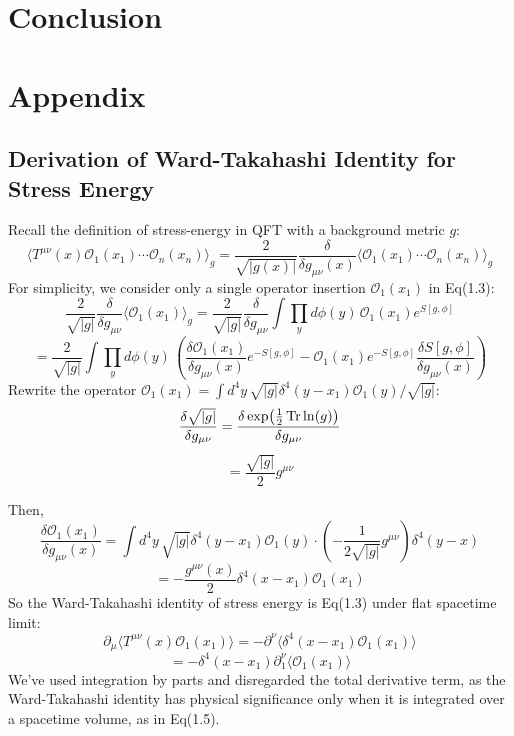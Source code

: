\documentclass[12pt]{article}
\numberwithin{equation}{section}
\newcommand\<\langle
\renewcommand\>\rangle
\renewcommand\.{\cdot}
\begin{document}
\section{Conclusion}

\section*{Appendix}
\subsection*{Derivation of Ward-Takahashi Identity for Stress Energy}
Recall the definition of stress-energy in QFT with a background metric $g$:
\begin{equation*}
    \langle T^{\mu\nu}(x)\mathcal{O}_1(x_1)\cdots\mathcal{O}_n(x_n)\rangle_g = \frac{2}{\sqrt{|g(x)|}}\frac{\delta}{\delta g_{\mu\nu}(x)}\langle\mathcal{O}_1(x_1)\cdots\mathcal{O}_n(x_n)\rangle_{g}
\end{equation*}
For simplicity, we consider only a single operator insertion $\mathcal{O}_1(x_1)$ in Eq(1.3):
\[
    \frac{2}{\sqrt{|g|}}\frac{\delta}{\delta g_{\mu\nu}}\langle\mathcal{O}_1(x_1)\rangle_g = \frac{2}{\sqrt{|g|}}\frac{\delta}{\delta g_{\mu\nu}}\int{\prod_{y}d\phi(y)\,}\mathcal{O}_1(x_1)e^{S[g,\phi]}
\]
\[
    = \frac{2}{\sqrt{|g|}}\int{\prod_{y}d\phi(y)\,}\left(\frac{\delta\mathcal{O}_1(x_1)}{\delta g_{\mu\nu}(x)}e^{-S[g,\phi]} - \mathcal{O}_1(x_1)e^{-S[g,\phi]}\frac{\delta S[g,\phi]}{\delta g_{\mu\nu}(x)}\right)
\]
Rewrite the operator $\mathcal{O}_1(x_1) = \int{d^4y\,} \sqrt{|g|}\delta^4(y-x_1)\mathcal{O}_1(y)/\sqrt{|g|}$:
\[
    \frac{\delta\sqrt{|g|}}{\delta g_{\mu\nu}} = \frac{\delta\exp(\frac{1}{2}\Tr\ln(g))}{\delta g_{\mu\nu}}
\]
\[
    =\frac{\sqrt{|g|}}{2}g^{\mu\nu}
\]

Then,
\[
    \frac{\delta\mathcal{O}_1(x_1)}{\delta g_{\mu\nu}(x)} = \int{d^4y\,\sqrt{|g|}}\delta^4(y-x_1)\mathcal{O}_1(y)\cdot(-\frac{1}{2\sqrt{|g|}}g^{\mu\nu})\delta^4(y-x)
\]
\[
    = -\frac{g^{\mu\nu}(x)}{2}\delta^4(x-x_1)\mathcal{O}_1(x_1)
\]
So the Ward-Takahashi identity of stress energy is Eq(1.3) under flat spacetime limit:
\[
     \partial_{\mu}\langle T^{\mu\nu}(x)\mathcal{O}_1(x_1)\rangle = -\partial^{\nu}\langle\delta^4(x-x_1)\mathcal{O}_1(x_1)\rangle
\]
\[
    = -\delta^4(x-x_1)\partial^{\nu}_{1}\langle\mathcal{O}_1(x_1)\rangle
\]
We've used integration by parts and disregarded the total derivative term, as the Ward-Takahashi identity has physical significance only when it is integrated over a spacetime volume, as in Eq(1.5).
\end{document}
